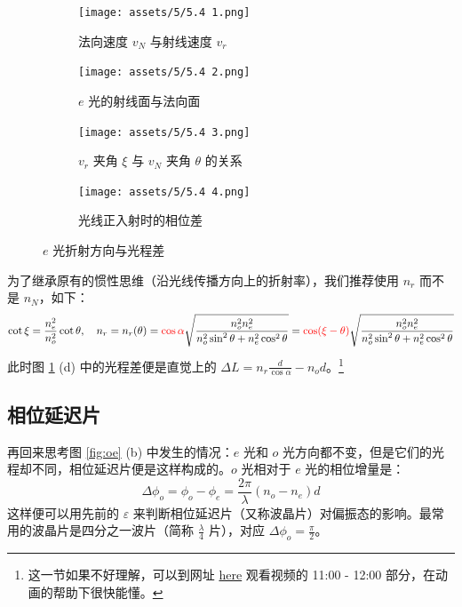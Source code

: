 \documentclass[UTF8]{report}
\theoremstyle{MyLineTheoremStyle} %
\theoremstyle{MyBlockTheoremStyle} %
\theoremstyle{MySubsubsectionStyle} %
\begin{document}
\begin{figure}[H]\centering
\begin{subfigure}[b]{0.2\columnwidth}\centering
    \texttt{[image: assets/5/5.4 1.png]}
    \caption{法向速度 $v_N$ 与射线速度 $v_r$}
\end{subfigure}\hfill
\begin{subfigure}[b]{0.22\columnwidth}\centering
    \texttt{[image: assets/5/5.4 2.png]}
    \caption{$e$ 光的射线面与法向面}
\end{subfigure}
\begin{subfigure}[b]{0.25\columnwidth}\centering
    \texttt{[image: assets/5/5.4 3.png]}
    \caption{$v_r$ 夹角 $\xi$ 与 $v_N$ 夹角 $\theta$ 的关系}
\end{subfigure}
\begin{subfigure}[b]{0.32\columnwidth}\centering
    \texttt{[image: assets/5/5.4 4.png]}
    \caption{光线正入射时的相位差}
\end{subfigure}
\caption{$e$ 光折射方向与光程差}
\label{fig: e光}
\end{figure}
为了继承原有的惯性思维（沿光线传播方向上的折射率），我们推荐使用 $n_r$ 而不是 $n_N$，如下：
\begin{equation}
    \cot \xi = \frac{n_e^2}{n_o^2} \cot \theta,\quad n_r = n_r(\theta) = {\color{red} \cos \alpha}\sqrt{ \frac{n_o^2n_e^2}{n_o^2\sin^2 \theta + n_e^2\cos^2 \theta} } = 
    {\color{red} \cos (\xi - \theta)}\sqrt{ \frac{n_o^2n_e^2}{n_o^2\sin^2 \theta + n_e^2\cos^2 \theta} } 
\end{equation}
此时图 \ref{fig: e光} (d) 中的光程差便是直觉上的 $\Delta L = n_r\frac{d}{\cos \alpha} - n_od$。\footnote{这一节如果不好理解，可以到网址 \href{https://www.bilibili.com/video/BV1VDpUeCEvv}{here} 观看视频的 11:00 - 12:00 部分，在动画的帮助下很快能懂。}


\subsection{相位延迟片}
再回来思考图 \ref{fig:oe} (b) 中发生的情况：$e$ 光和 $o$ 光方向都不变，但是它们的光程却不同，相位延迟片便是这样构成的。$o$ 光相对于 $e$ 光的相位增量是：
\begin{equation}
\Delta \phi_o = \phi_o - \phi_e = \frac{2\pi}{\lambda} (n_o - n_e)d
\end{equation}
这样便可以用先前的 $\varepsilon$ 来判断相位延迟片（又称波晶片）对偏振态的影响。最常用的波晶片是四分之一波片（简称 $\frac{\lambda}{4}$ 片），对应 $\Delta \phi_o = \frac{\pi}{2}$。
\end{document}
